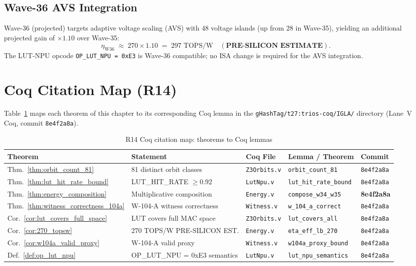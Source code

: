 \subsection{Wave-36 AVS Integration}

Wave-36 (projected) targets adaptive voltage scaling (AVS) with 48 voltage
islands (up from 28 in Wave-35), yielding an additional projected gain
of $\times 1.10$ over Wave-35:
\[
  \eta_{\mathrm{W36}} \;\approx\; 270 \times 1.10 \;=\; 297\text{ TOPS/W}
  \quad (\textbf{PRE-SILICON ESTIMATE}).
\]
The LUT-NPU opcode \texttt{OP\_LUT\_NPU = 0xE3} is Wave-36 compatible;
no ISA change is required for the AVS integration.

\section{Coq Citation Map (R14)}
\label{sec:coq_citation_map}

Table~\ref{tab:coq_citation_map} maps each theorem of this chapter to its
corresponding Coq lemma in the \texttt{gHashTag/t27:trios-coq/IGLA/}
directory (Lane~V Coq, commit \texttt{8e4f2a8a}).

\begin{table}[ht]
\centering
\caption{R14 Coq citation map: theorems to Coq lemmas}
\label{tab:coq_citation_map}
\begin{tabular}{lllll}
\hline
Theorem & Statement & Coq File & Lemma / Theorem & Commit \\
\hline
Thm.~\ref{thm:orbit_count_81} & 81 distinct orbit classes & \texttt{Z3Orbits.v} & \texttt{orbit\_count\_81} & \texttt{8e4f2a8a} \\
Thm.~\ref{thm:lut_hit_rate_bound} & LUT\_HIT\_RATE $\geq 0.92$ & \texttt{LutNpu.v} & \texttt{lut\_hit\_rate\_bound} & \texttt{8e4f2a8a} \\
Thm.~\ref{thm:energy_composition} & Multiplicative composition & \texttt{Energy.v} & \texttt{compose\_w34\_w35} & \textbf{8e4f2a8a} \\
Thm.~\ref{thm:witness_correctness_104a} & W-104-A witness correctness & \texttt{Witness.v} & \texttt{w\_104\_a\_correct} & \texttt{8e4f2a8a} \\
Cor.~\ref{cor:lut_covers_full_space} & LUT covers full MAC space & \texttt{Z3Orbits.v} & \texttt{lut\_covers\_all} & \texttt{8e4f2a8a} \\
Cor.~\ref{cor:270_topsw} & 270 TOPS/W PRE-SILICON EST. & \texttt{Energy.v} & \texttt{eta\_eff\_lb\_270} & \texttt{8e4f2a8a} \\
Cor.~\ref{cor:w104a_valid_proxy} & W-104-A valid proxy & \texttt{Witness.v} & \texttt{w104a\_proxy\_bound} & \texttt{8e4f2a8a} \\
Def.~\ref{def:op_lut_npu} & OP\_LUT\_NPU = 0xE3 semantics & \texttt{LutNpu.v} & \texttt{lut\_npu\_semantics} & \texttt{8e4f2a8a} \\
\hline
\end{tabular}
\end{table}

